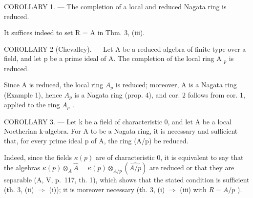 COROLLARY 1. --- The completion of a local and reduced Nagata ring is reduced.

It suffices indeed to set R = A in Thm. 3, (iii).

COROLLARY 2 (Chevalley). --- Let A be a reduced algebra of finite type over a field, and let p be a prime ideal of A. The completion of the local ring A \(_{p}\) is reduced.

Since A is reduced, the local ring \(A_{p}\) is reduced; moreover, A is a Nagata ring (Example 1), hence \(A_{p}\) is a Nagata ring (prop. 4), and cor. 2 follows from cor. 1, applied to the ring \(A_{p}\) .

COROLLARY 3. --- Let k be a field of characteristic 0, and let A be a local Noetherian k-algebra. For A to be a Nagata ring, it is necessary and sufficient that, for every prime ideal p of A, the ring (A/p) be reduced.

Indeed, since the fields \(\kappa(p)\) are of characteristic 0, it is equivalent to say that the algebras \(\kappa(p) \otimes_{A} \hat{A} = \kappa(p) \otimes_{A/p} (\widehat{A/p})\) are reduced or that they are separable (A, V, p.~117, th. 1), which shows that the stated condition is sufficient (th. 3, (ii) \(\Rightarrow\) (i)); it is moreover necessary (th. 3, (i) \(\Rightarrow\) (iii) with \(R = A/p\) ).

